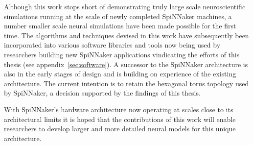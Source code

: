 		Although this work stops short of demonstrating truly large scale
		neuroscientific simulations running at the scale of newly completed
		SpiNNaker machines, a number smaller scale neural simulations have been
		made possible for the first time. The algorithms and techniques devised in
		this work have subsequently been incorporated into various software
		libraries and tools now being used by researchers building new SpiNNaker
		applications vindicating the efforts of this thesis (see
		appendix~\ref{sec:software}). A successor to the SpiNNaker architecture is
		also in the early stages of design and is building on experience of the
		existing architecture. The current intention is to retain the hexagonal
		torus topology used by SpiNNaker, a decision supported by the findings of
		this thesis.
		
		With SpiNNaker's hardware architecture now operating at scales close to its
		architectural limits it is hoped that the contributions of this work will
		enable researchers to develop larger and more detailed neural models for
		this unique architecture.
